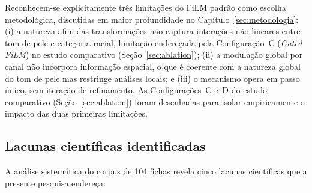Reconhecem-se explicitamente três limitações do FiLM padrão como escolha metodológica, discutidas em maior profundidade no Capítulo~\ref{sec:metodologia}: (i) a natureza afim das transformações não captura interações não-lineares entre tom de pele e categoria racial, limitação endereçada pela Configuração~C (\emph{Gated FiLM}) no estudo comparativo (Seção~\ref{sec:ablation}); (ii) a modulação global por canal não incorpora informação espacial, o que é coerente com a natureza global do tom de pele mas restringe análises locais; e (iii) o mecanismo opera em passo único, sem iteração de refinamento. As Configurações~C e~D do estudo comparativo (Seção~\ref{sec:ablation}) foram desenhadas para isolar empiricamente o impacto das duas primeiras limitações.

\subsection{Lacunas científicas identificadas}
\label{sec:rl_gaps}

A análise sistemática do corpus de 104 fichas revela cinco lacunas científicas que a presente pesquisa endereça:


